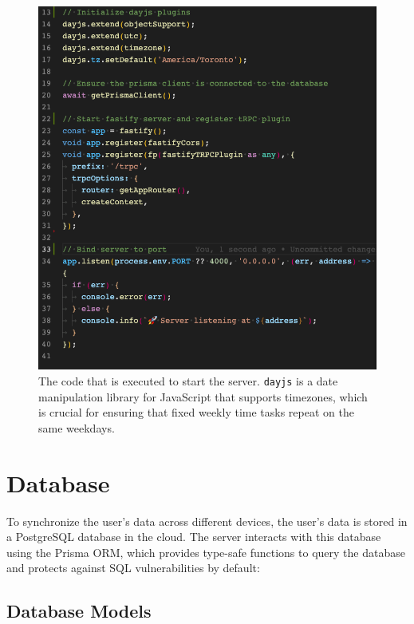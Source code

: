 \documentclass[notitlepage, 12pt]{report}
\newcommand{\code}[1]{\texttt{#1}}
\begin{document}
\begin{figure}[H]
	\caption{The code that is executed to start the server. \code{dayjs} is a date manipulation library for JavaScript that supports timezones, which is crucial for ensuring that fixed weekly time tasks repeat on the same weekdays.}
	\includegraphics[width=\textwidth]{server-start.png}
\end{figure}

\newpage

\section*{Database}

To synchronize the user's data across different devices, the user's data is stored in a PostgreSQL database in the cloud. The server interacts with this database using the Prisma ORM, which provides type-safe functions to query the database and protects against SQL vulnerabilities by default:

\subsection*{Database Models}
\end{document}
